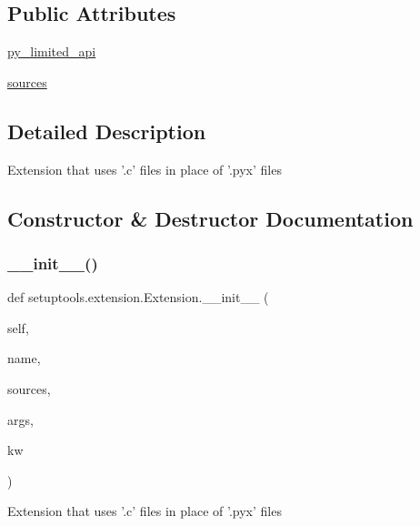 \subsection*{Public Attributes}
\begin{DoxyCompactItemize}
\item 
\hyperlink{classsetuptools_1_1extension_1_1Extension_a738c98bc01dd531f3c7ff4bc9a893011}{py\+\_\+limited\+\_\+api}
\item 
\hyperlink{classsetuptools_1_1extension_1_1Extension_a267f08175ebbf89924e8f8d6d707c5f8}{sources}
\end{DoxyCompactItemize}


\subsection{Detailed Description}
\begin{DoxyVerb}Extension that uses '.c' files in place of '.pyx' files\end{DoxyVerb}
 

\subsection{Constructor \& Destructor Documentation}
\mbox{\label{classsetuptools_1_1extension_1_1Extension_ab04051fffd82a5063ee962f9f89283e0}} 
\subsubsection{\texorpdfstring{\+\_\+\+\_\+init\+\_\+\+\_\+()}{\_\_init\_\_()}}
{\footnotesize\ttfamily def setuptools.\+extension.\+Extension.\+\_\+\+\_\+init\+\_\+\+\_\+ (\begin{DoxyParamCaption}\item[{}]{self,  }\item[{}]{name,  }\item[{}]{sources,  }\item[{}]{args,  }\item[{}]{kw }\end{DoxyParamCaption})}

\begin{DoxyVerb}Extension that uses '.c' files in place of '.pyx' files\end{DoxyVerb}
 

